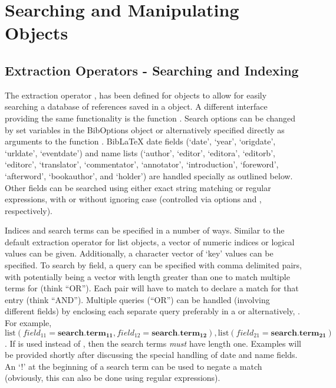 \documentclass[article]{jss}\usepackage[]{graphicx}\usepackage[]{color}
\newcommand{\bt}{\`{}}
\begin{document}
\section[Searching and Manipulating BibEntry Objects]{Searching and Manipulating  Objects}\label{sec_manip}
\subsection{Extraction Operators - Searching and Indexing}\label{searchsec}
The extraction operator \code{\bt[\bt}, has been defined for  objects to allow for easily searching a database of references saved in a  object.  A different interface providing the same functionality is the function .  Search options can be changed by set variables in the BibOptions object or alternatively specified directly as arguments to the function .  BibLaTeX date fields (`date', `year', `origdate', `urldate', `eventdate') and name lists (`author', `editor', `editora', `editorb', `editorc', `translator', `commentator', `annotator', `introduction', `foreword', `afterword', `bookauthor', and `holder') are handled specially as outlined below.  Other fields can be searched using either exact string matching or regular expressions, with or without ignoring case (controlled via options  and , respectively).

Indices and search terms can be specified in a number of ways.  Similar to the default extraction operator for list objects, a vector of numeric indices or logical values can be given.  Additionally, a character vector of `key' values can be specified.  To search by field, a query can be specified with comma delimited  pairs, with  potentially being a vector with length greater than one to match multiple terms for  (think ``OR'').  Each  pair will have to match to declare a match for that entry (think ``AND'').  Multiple queries (``OR'') can be handled (involving different fields) by enclosing each separate query preferably in a  or alternatively, .  For example, $\text{list}(field_{11} = \mathbf{search.term_{11}},field_{12}=\mathbf{search.term_{12}}),\text{list}(field_{21}=\mathbf{search.term_{21}})$.  If  is used instead of , then the search terms \emph{must} have length one.  Examples will be provided shortly after discussing the special handling of date and name fields.  An `!' at the beginning of a search term can be used to negate a match (obviously, this can also be done using regular expressions).
\end{document}
